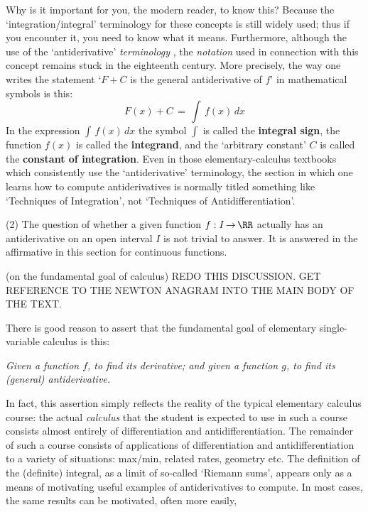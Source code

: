 {        Why is it important for you, the modern reader, to know this? Because the `integration/integral' terminology for these concepts is still widely used;
    thus if you encounter it, you need to know what it means. Furthermore, although the use of the `antiderivative' {\em terminology} ,
    the {\em notation} used in connection with this concept remains stuck in the eighteenth century.
    More precisely, the way one writes the statement `$F+C$ is the general antiderivative of $f$' in mathematical symbols is this:
        \begin{displaymath}
        F(x)+C \,=\, \int\, f(x)\,dx
        \end{displaymath}
    In the expression ${\displaystyle \int\, f(x)\,dx}$ the symbol ${\displaystyle \int}$ is called the {\bf integral sign},
    the function $f(x)$ is called the {\bf integrand}, and the `arbitrary constant' $C$ is called the {\bf constant of integration}.
    Even in those elementary-calculus textbooks which consistently use the `antiderivative' terminology,
     the section in which one learns how to compute antiderivatives is normally titled something like `Techniques of Integration',
    not `Techniques of Antidifferentiation'.

\V

        (2) The question of whether a given function $f:I \,{\rightarrow}\, {\RR}$ actually has an antiderivative on an open interval $I$ is not trivial to answer.
    It is answered in the affirmative in this section for continuous functions.

\VV

{\footnotesize \underline{\Note} (on the fundamental goal of calculus)
    REDO THIS DISCUSSION. GET REFERENCE TO THE NEWTON ANAGRAM INTO THE MAIN BODY OF THE TEXT.

    There is good reason to assert that the fundamental goal of elementary single-variable calculus is this:

\V

    {\em Given a function $f$, to find its derivative;
    and given a function $g$, to find its (general) antiderivative.}

\V

\noindent In fact, this assertion simply reflects the reality of the typical elementary calculus course:
    the actual {\em calculus} that the student is expected to use in such a course consists almost entirely of differentiation and antidifferentiation.
    The remainder of such a course consists of applications of differentiation and antidifferentiation to a variety of situations:
    max/min, related rates, geometry etc. The definition of the (definite) integral, as a limit of so-called `Riemann sums',
    appears only as a means of motivating useful examples of antiderivatives to compute.
    In most cases, the same results can be motivated, often more easily, 

}}
